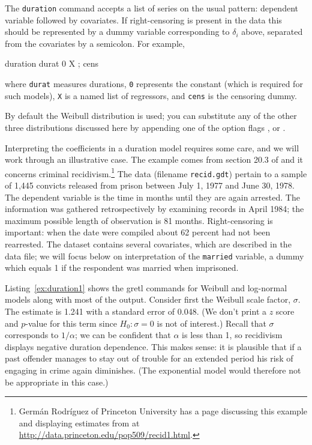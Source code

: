 The \texttt{duration} command accepts a list of series on the usual
pattern: dependent variable followed by covariates. If right-censoring
is present in the data this should be represented by a dummy variable
corresponding to $\delta_i$ above, separated from the covariates by
a semicolon. For example,
\begin{code}
duration durat 0 X ; cens
\end{code}
where \texttt{durat} measures durations, \texttt{0} represents the
constant (which is required for such models), \texttt{X} is a named
list of regressors, and \texttt{cens} is the censoring dummy.

By default the Weibull distribution is used; you can substitute any of
the other three distributions discussed here by appending one of the
option flags ,  or 
.

Interpreting the coefficients in a duration model requires some care,
and we will work through an illustrative case. The example comes from
section 20.3 of \cite{wooldridge-panel} and it concerns criminal
recidivism.\footnote{Germ\'an Rodr\'iguez of Princeton University has a
  page discussing this example and displaying estimates from
   at \url{http://data.princeton.edu/pop509/recid1.html}.}
The data (filename \texttt{recid.gdt}) pertain to a sample of 1,445
convicts released from prison between July 1, 1977 and June 30,
1978. The dependent variable is the time in months until they are
again arrested. The information was gathered retrospectively by
examining records in April 1984; the maximum possible length of
observation is 81 months.  Right-censoring is important: when the date
were compiled about 62 percent had not been rearrested.  The dataset
contains several covariates, which are described in the data file; we
will focus below on interpretation of the \texttt{married} variable, a
dummy which equals 1 if the respondent was married when imprisoned.

Listing~\ref{ex:duration1} shows the gretl commands for Weibull and
log-normal models along with most of the output.  Consider first the
Weibull scale factor, $\sigma$. The estimate is 1.241 with a standard
error of 0.048.  (We don't print a $z$ score and $p$-value for this
term since $H_0: \sigma = 0$ is not of interest.)  Recall that
$\sigma$ corresponds to $1/\alpha$; we can be confident that $\alpha$
is less than 1, so recidivism displays negative duration dependence.
This makes sense: it is plausible that if a past offender manages to
stay out of trouble for an extended period his risk of engaging in
crime again diminishes. (The exponential model would therefore not be
appropriate in this case.)

